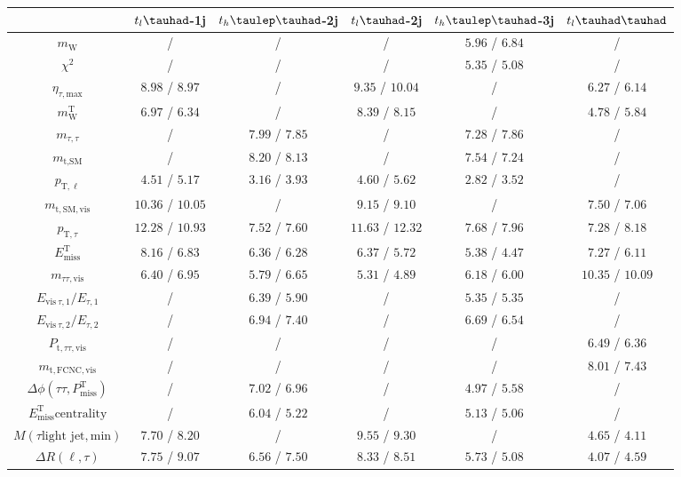 \centering
\begin{tabular}{cccccc} \toprule\toprule
 & $t_{l}\tauhad$-1j & $t_{h}\tlhad$-2j & $t_{l}\tauhad$-2j & $t_{h}\tlhad$-3j & $t_l\thadhad$\\\midrule
 $m_{\text{W}}$ &  / &  / &  / & $5.96$ / $6.84$ &  /\\
$\chi^{2}$ &  / &  / &  / & $5.35$ / $5.08$ &  /\\
$\eta_{\tau,\text{max}}$ & $8.98$ / $8.97$ &  / & $9.35$ / $10.04$ &  / & $6.27$ / $6.14$\\
$m^{\text{T}}_{\text{W}}$ & $6.97$ / $6.34$ &  / & $8.39$ / $8.15$ &  / & $4.78$ / $5.84$\\
$m_{\tau,\tau}$ &  / & $7.99$ / $7.85$ &  / & $7.28$ / $7.86$ &  /\\
$m_{\text{t},\text{SM}}$ &  / & $8.20$ / $8.13$ &  / & $7.54$ / $7.24$ &  /\\
$p_{\text{T},\ell}$ & $4.51$ / $5.17$ & $3.16$ / $3.93$ & $4.60$ / $5.62$ & $2.82$ / $3.52$ &  /\\
$m_{\text{t},\text{SM},\text{vis}}$ & $10.36$ / $10.05$ &  / & $9.15$ / $9.10$ &  / & $7.50$ / $7.06$\\
$p_{\text{T},\tau}$ & $12.28$ / $10.93$ & $7.52$ / $7.60$ & $11.63$ / $12.32$ & $7.68$ / $7.96$ & $7.28$ / $8.18$\\
$E^{\text{T}}_{\text{miss}}$ & $8.16$ / $6.83$ & $6.36$ / $6.28$ & $6.37$ / $5.72$ & $5.38$ / $4.47$ & $7.27$ / $6.11$\\
$m_{\tau\tau,\text{vis}}$ & $6.40$ / $6.95$ & $5.79$ / $6.65$ & $5.31$ / $4.89$ & $6.18$ / $6.00$ & $10.35$ / $10.09$\\
$E_{\text{vis}~\tau,1}/E_{\tau,1}$ &  / & $6.39$ / $5.90$ &  / & $5.35$ / $5.35$ &  /\\
$E_{\text{vis}~\tau,2}/E_{\tau,2}$ &  / & $6.94$ / $7.40$ &  / & $6.69$ / $6.54$ &  /\\
$P_{\text{t},\tau\tau,\text{vis}}$ &  / &  / &  / &  / & $6.49$ / $6.36$\\
$m_{\text{t},\text{FCNC},\text{vis}}$ &  / &  / &  / &  / & $8.01$ / $7.43$\\
$\Delta\phi(\tau\tau,P^{\text{T}}_{\text{miss}})$ &  / & $7.02$ / $6.96$ &  / & $4.97$ / $5.58$ &  /\\
$E^{\text{T}}_{\text{miss}} \text{centrality}$ &  / & $6.04$ / $5.22$ &  / & $5.13$ / $5.06$ &  /\\
$M(\tau \text{light~jet},\text{min})$ & $7.70$ / $8.20$ &  / & $9.55$ / $9.30$ &  / & $4.65$ / $4.11$\\
$\Delta R(\ell,\tau)$ & $7.75$ / $9.07$ & $6.56$ / $7.50$ & $8.33$ / $8.51$ & $5.73$ / $5.08$ & $4.07$ / $4.59$\\

\end{tabular}
